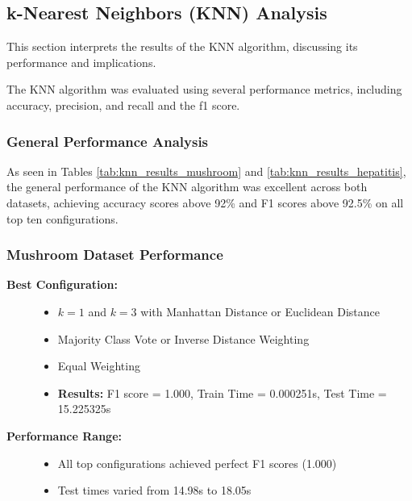 \subsection{k-Nearest Neighbors (KNN) Analysis}
\label{subsubsec:discussion-knn}

This section interprets the results of the KNN algorithm, discussing its performance and implications.

The KNN algorithm was evaluated using several performance metrics, including accuracy, precision, and recall and the f1 score.

\subsubsection*{General Performance Analysis}
As seen in Tables \ref{tab:knn_results_mushroom} and \ref{tab:knn_results_hepatitis}, the general performance of the KNN algorithm was excellent across both datasets,
achieving accuracy scores above 92\% and F1 scores above 92.5\% on all top ten configurations.

\subsubsection{Mushroom Dataset Performance}

\begin{description}
    \item[\textbf{Best Configuration:}]\leavevmode
        \begin{itemize}
            \item $k = 1$ and $k = 3$ with Manhattan Distance or Euclidean Distance
            \item Majority Class Vote or Inverse Distance Weighting
            \item Equal Weighting
            \item \textbf{Results:} F1 score = 1.000, Train Time = 0.000251s, Test Time = 15.225325s
        \end{itemize}
    
    \item[\textbf{Performance Range:}]\leavevmode
        \begin{itemize}
            \item All top configurations achieved perfect F1 scores (1.000)
            \item Test times varied from 14.98s to 18.05s
        \end{itemize}
\end{description}

